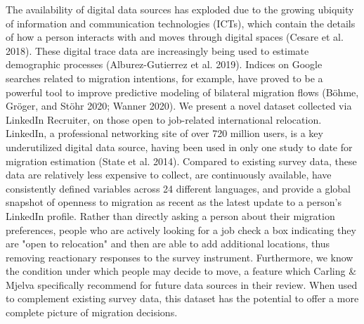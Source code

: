 The availability of digital data sources has exploded due to the growing ubiquity of information and communication technologies (ICTs), which contain the details of how a person interacts with and moves through digital spaces (Cesare et al. 2018). These digital trace data are increasingly being used to estimate demographic processes (Alburez-Gutierrez et al. 2019). Indices on Google searches related to migration intentions, for example, have proved to be a powerful tool to improve predictive modeling of bilateral migration flows (Böhme, Gröger, and Stöhr 2020; Wanner 2020). We present a novel dataset collected via LinkedIn Recruiter, on those open to job-related international relocation. LinkedIn, a professional networking site of over 720 million users, is a key underutilized digital data source, having been used in only one study to date for migration estimation (State et al. 2014). Compared to existing survey data, these data are relatively less expensive to collect, are continuously available, have consistently defined variables across 24 different languages, and provide a global snapshot of openness to migration as recent as the latest update to a person’s LinkedIn profile. Rather than directly asking a person about their migration preferences, people who are actively looking for a job check a box indicating they are "open to relocation" and then are able to add additional locations, thus removing reactionary responses to the survey instrument. Furthermore, we know the condition under which people may decide to move, a feature which Carling \& Mjelva specifically recommend for future data sources in their review. When used to complement existing survey data, this dataset has the potential to offer a more complete picture of migration decisions.

